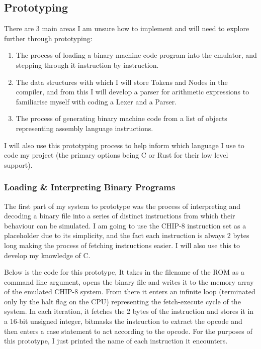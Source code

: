 \subsection{Prototyping}
There are 3 main areas I am unsure how to implement and will need to explore further through prototyping:
\begin{enumerate}
    \item The process of loading a binary machine code program into the emulator, and stepping through it instruction by instruction.
    \item The data structures with which I will store Tokens and Nodes in the compiler, and from this I will develop a parser for arithmetic expressions to familiarise myself with coding a Lexer and a Parser.
    \item The process of generating binary machine code from a list of objects representing assembly language instructions.
\end{enumerate}

I will also use this prototyping process to help inform which language I use to code my project (the primary options being C or Rust for their low level support). 

\subsubsection{Loading \& Interpreting Binary Programs}
The first part of my system to prototype was the process of interpreting and decoding a binary file into a series of distinct instructions from which their behaviour can be simulated. I am going to use the CHIP-8 instruction set as a placeholder due to its simplicity, and the fact each instruction is always 2 bytes long making the process of fetching instructions easier. I will also use this to develop my knowledge of C. 

Below is the code for this prototype, It takes in the filename of the ROM as a command line argument, opens the binary file and writes it to the memory array of the emulated CHIP-8 system. From there it enters an infinite loop (terminated only by the halt flag on the CPU) representing the fetch-execute cycle of the system. In each iteration, it fetches the 2 bytes of the instruction and stores it in a 16-bit unsigned integer, bitmasks the instruction to extract the opcode and then enters a case statement to act according to the opcode. For the purposes of this prototype, I just printed the name of each instruction it encounters.

